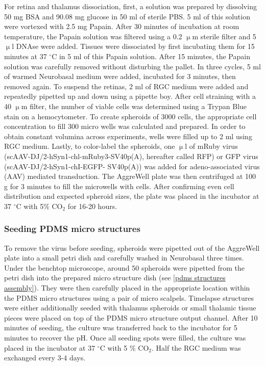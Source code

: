 For retina and thalamus dissociation, first, a solution was prepared by
dissolving 50 mg BSA and 90.08 mg glucose in 50 ml of sterile PBS. 5 ml of this
solution were vortexed with 2.5 mg Papain. After 30 minutes of incubation at
room temperature, the Papain solution was filtered using a 0.2 $\upmu$m sterile
filter and 5 $\upmu$l DNAse were added. Tissues were dissociated by first
incubating them for 15 minutes at 37 $^{\circ}$C in 5 ml of this Papain
solution. After 15 minutes, the Papain solution was carefully removed without
disturbing the pallet. In three cycles, 5 ml of warmed Neurobasal medium were
added, incubated for 3 minutes, then removed again. To suspend the retinas, 2 ml
of RGC medium were added and repeatedly pipetted up and down using a pipette
boy. After cell straining with a 40 $\upmu$m filter, the number of viable cells
was determined using a Trypan Blue stain on a hemocytometer. To create spheroids
of 3000 cells, the appropriate cell concentration to fill 300 micro wells was
calculated and prepared. In order to obtain constant volumina across
experiments, wells were filled up to 2 ml using RGC medium. Lastly, to
color-label the spheroids, one $\upmu$l of mRuby virus
(scAAV-DJ/2-hSyn1-chl-mRuby3-SV40p(A), hereafter called RFP) or GFP virus
(scAAV-DJ/2-hSyn1-chI-EGFP- SV40p(A)) was added for adeno-associated virus (AAV)
mediated transduction. The AggreWell\textsuperscript{\texttrademark} plate was
then centrifuged at 100 g for 3 minutes to fill the microwells with cells. After
confirming even cell distribution and expected spheroid sizes, the plate was
placed in the incubator at 37 $^{\circ}$C with 5$\%$ CO$_{2}$ for 16-20 hours. 

\subsubsection{Seeding PDMS micro structures}
To remove the virus before seeding, spheroids were pipetted out of the
AggreWell\textsuperscript{\texttrademark} plate into a small petri dish and
carefully washed in Neurobasal three times. Under the benchtop microscope,
around 50 spheroids were pipetted from the petri dish into the prepared micro
structure dish (see \ref{pdms structures assembly}). They were then carefully
placed in the appropriate location within the PDMS micro structures using a pair
of micro scalpels. Timelapse structures were either additionally seeded with
thalamus spheroids or small thalamic tissue pieces were placed on top of the
PDMS micro structure output channel. After 10 minutes of seeding, the culture
was transferred back to the incubator for 5 minutes to recover the pH. Once all
seeding spots were filled, the culture was placed in the incubator at 37
$^{\circ}$C with 5  \% CO$_{2}$. Half the RGC medium was exchanged every 3-4
days.

